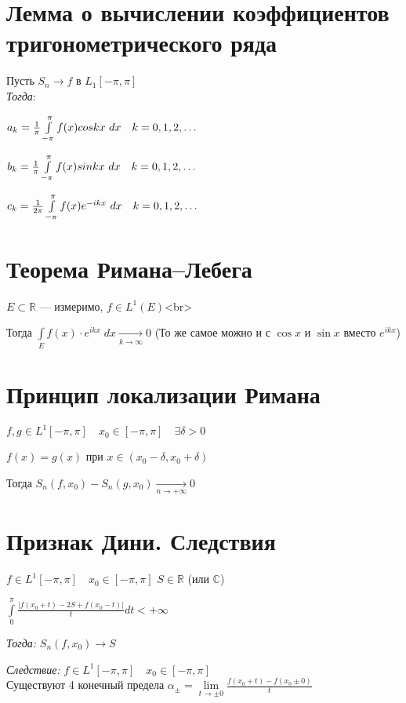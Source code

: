 \documentclass[paper=a4, fontsize=17pt]{article}
\begin{document}
\section{Лемма о вычислении коэффициентов тригонометрического ряда}

Пусть $S_n \rightarrow f$ в $L_1[-\pi, \pi]$\\ 

\emph{Тогда}:

$a_k = \frac{1}{\pi}\int\limits_{-\pi}^{\pi}f(x)coskx\ dx \quad k = 0, 1, 2, \mathellipsis$

$b_k = \frac{1}{\pi}\int\limits_{-\pi}^{\pi}f(x)sinkx\ dx \quad k = 0, 1, 2, \mathellipsis$

$c_k = \frac{1}{2\pi}\int\limits_{-\pi}^{\pi}f(x)e^{-ikx}\ dx \quad k = 0, 1, 2, \mathellipsis$

\section{Теорема Римана--Лебега}

$E \subset \mathbb{R}$ — измеримо, $f \in L^1(E)$<br>

Тогда $\displaystyle\int\limits_E {f(x) \cdot e^{ikx} \; dx} \xrightarrow[k \to \infty]{} 0$ (То же самое можно и с $\cos {x}$ и $\sin {x}$ вместо $e^{ikx}$)

\section{Принцип локализации Римана}

$f, g \in L^1[-\pi, \pi] \quad x_0 \in [-\pi, \pi] \quad \exists \delta > 0$

$f(x) = g(x) $ при $ x \in (x_0 - \delta, x_0 + \delta)$

Тогда $S_n(f, x_0) - S_n(g, x_0) \xrightarrow[n \to +\infty]{} 0$

\section{Признак Дини. Следствия}

$f \in L^1[-\pi, \pi] \quad x_0 \in [-\pi, \pi] $
$S \in \mathbb R $ (или $\mathbb C$)

$\int\limits_0^{\pi} \frac{\lvert f(x_0 + t) - 2S + f(x_0 - t) \rvert}{t} dt < +\infty$

\emph{Тогда:} $S_n(f, x_0) \rightarrow S$

\emph{Следствие:}
$f \in L^1[-\pi, \pi] \quad x_0 \in [-\pi, \pi] $\\
Существуют 4 конечный предела $\alpha_{\pm} = \lim\limits_{t\rightarrow \pm 0} \frac{f(x_0 + t) - f(x_0 \pm 0)}{t}$
\end{document}
